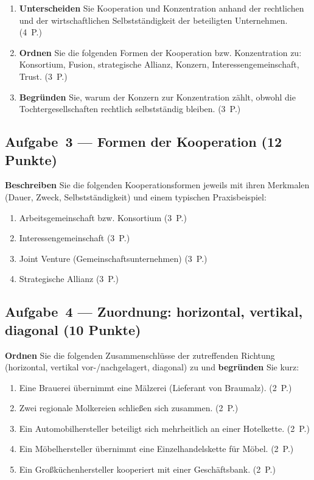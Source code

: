 \documentclass[11pt, a4paper]{article}
\begin{document}
\begin{enumerate}[label=(\alph*)]
  \item \textbf{Unterscheiden} Sie Kooperation und Konzentration anhand der rechtlichen
    und der wirtschaftlichen Selbstständigkeit der beteiligten Unternehmen. \hfill (4~P.)
  \item \textbf{Ordnen} Sie die folgenden Formen der Kooperation bzw. Konzentration zu:
    Konsortium, Fusion, strategische Allianz, Konzern, Interessengemeinschaft, Trust.
    \hfill (3~P.)
  \item \textbf{Begründen} Sie, warum der Konzern zur Konzentration zählt, obwohl die
    Tochtergesellschaften rechtlich selbstständig bleiben. \hfill (3~P.)
\end{enumerate}

\subsection*{Aufgabe~3 --- Formen der Kooperation (12 Punkte)}

\textbf{Beschreiben} Sie die folgenden Kooperationsformen jeweils mit ihren Merkmalen
(Dauer, Zweck, Selbstständigkeit) und einem typischen Praxisbeispiel:

\begin{enumerate}[label=(\alph*)]
  \item Arbeitsgemeinschaft bzw. Konsortium \hfill (3~P.)
  \item Interessengemeinschaft \hfill (3~P.)
  \item Joint Venture (Gemeinschaftsunternehmen) \hfill (3~P.)
  \item Strategische Allianz \hfill (3~P.)
\end{enumerate}

\subsection*{Aufgabe~4 --- Zuordnung: horizontal, vertikal, diagonal (10 Punkte)}

\textbf{Ordnen} Sie die folgenden Zusammenschlüsse der zutreffenden Richtung
(horizontal, vertikal vor-/nachgelagert, diagonal) zu und \textbf{begründen} Sie kurz:

\begin{enumerate}[label=(\alph*)]
  \item Eine Brauerei übernimmt eine Mälzerei (Lieferant von Braumalz). \hfill (2~P.)
  \item Zwei regionale Molkereien schließen sich zusammen. \hfill (2~P.)
  \item Ein Automobilhersteller beteiligt sich mehrheitlich an einer Hotelkette. \hfill (2~P.)
  \item Ein Möbelhersteller übernimmt eine Einzelhandelskette für Möbel. \hfill (2~P.)
  \item Ein Großküchenhersteller kooperiert mit einer Geschäftsbank. \hfill (2~P.)
\end{enumerate}
\end{document}
